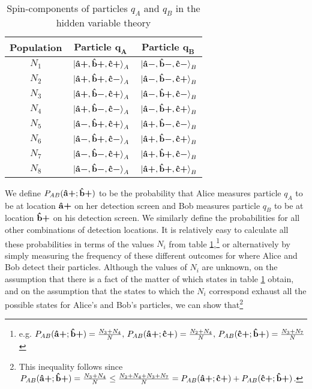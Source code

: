       \begin{table}[ht]
      \caption{Spin-components of particles $q_A$ and $q_B$ in the hidden variable theory}
      \centering
      \begin{tabular}{c c c} 
      \\ 
      \hline
      \textbf{Population}& \textbf{Particle} $\bm{q_A}$ & \textbf{Particle} $\bm{q_B}$ \\ [0.5ex] 
      \hline
      $N_1$ & $\ket*{\vb{\hat{{a}}}\bm{+},\vb{\hat{{b}}}\bm{+},\vb{\hat{{c}}}\bm{+}}_A$ & $\ket*{\vb{\hat{{a}}}\bm{-},\vb{\hat{{b}}}\bm{-},\vb{\hat{{c}}}\bm{-}}_B$ \\ 
      
      $N_2$ & $\ket*{\vb{\hat{{a}}}\bm{+},\vb{\hat{{b}}}\bm{+},\vb{\hat{{c}}}\bm{-}}_A$ & $\ket*{\vb{\hat{{a}}}\bm{-},\vb{\hat{{b}}}\bm{-},\vb{\hat{{c}}}\bm{+}}_B $\\ 
      
      $N_3$ & $\ket*{\vb{\hat{{a}}}\bm{+},\vb{\hat{{b}}}\bm{-},\vb{\hat{{c}}}\bm{+}}_A$ & $\ket*{\vb{\hat{{a}}}\bm{-},\vb{\hat{{b}}}\bm{+},\vb{\hat{{c}}}\bm{-}}_B$ \\ 
      
      $N_4$ & $\ket*{\vb{\hat{{a}}}\bm{+},\vb{\hat{{b}}}\bm{-},\vb{\hat{{c}}}\bm{-}}_A$ & $\ket*{\vb{\hat{{a}}}\bm{-},\vb{\hat{{b}}}\bm{+},\vb{\hat{{c}}}\bm{+}}_B $\\ 
      
      $N_5$ & $\ket*{\vb{\hat{{a}}}\bm{-},\vb{\hat{{b}}}\bm{+},\vb{\hat{{c}}}\bm{+}}_A$ & $\ket*{\vb{\hat{{a}}}\bm{+},\vb{\hat{{b}}}\bm{-},\vb{\hat{{c}}}\bm{-}}_B$ \\ 
      
      $N_6$ & $\ket*{\vb{\hat{{a}}}\bm{-},\vb{\hat{{b}}}\bm{+},\vb{\hat{{c}}}\bm{-}}_A$ & $\ket*{\vb{\hat{{a}}}\bm{+},\vb{\hat{{b}}}\bm{-},\vb{\hat{{c}}}\bm{+}}_B$ \\ 
      
      $N_7$ & $\ket*{\vb{\hat{{a}}}\bm{-},\vb{\hat{{b}}}\bm{-},\vb{\hat{{c}}}\bm{+}}_A$ & $\ket*{\vb{\hat{{a}}}\bm{+},\vb{\hat{{b}}}\bm{+},\vb{\hat{{c}}}\bm{-} }_B$\\ 
      
      $N_8$ & $\ket*{\vb{\hat{{a}}}\bm{-},\vb{\hat{{b}}}\bm{-},\vb{\hat{{c}}}\bm{-}}_A$ & $\ket*{\vb{\hat{{a}}}\bm{+},\vb{\hat{{b}}}\bm{+},\vb{\hat{{c}}}\bm{+}}_B$ \\ 
      \hline
      \end{tabular}
      \label{hiddentable}
      \end{table}
       We define $P_{AB}(\vb{\hat{{a}}}\bm{+};\vb{\hat{{b}}}\bm{+})$ to be the probability that Alice measures particle $q_A$ to be at location $\vb{\hat{{a}}}\bm{+}$ on her detection screen and Bob measures particle $q_B$ to be at location $\vb{\hat{{b}}}\bm{+}$ on his detection screen. We similarly define the probabilities for all other combinations of detection locations. It is relatively easy to calculate all these probabilities in terms of the values $N_i$ from table \ref{hiddentable},\footnote{e.g.  $P_{AB}(\vb{\hat{{a}}}\bm{+};\vb{\hat{{b}}}\bm{+})=\frac{N_3+N_4}{N},\, P_{AB}(\vb{\hat{{a}}}\bm{+};\vb{\hat{{c}}}\bm{+})=\frac{N_2+N_4}{N},\,P_{AB}(\vb{\hat{{c}}}\bm{+};\vb{\hat{{b}}}\bm{+})=\frac{N_3+N_7}{N}$  } or alternatively by simply measuring the frequency of these different outcomes for where Alice and Bob detect their particles. Although the values of $N_i$ are unknown, on the assumption that there is a fact of the matter of which states in table \ref{hiddentable} obtain, and on the assumption that the states to which the $N_i$ correspond exhaust all the possible states for Alice's and Bob's particles, we can show that\footnote{This inequality follows since $P_{AB}(\vb{\hat{{a}}}\bm{+};\vb{\hat{{b}}}\bm{+})=\frac{N_3+N_4}{N}\leq \frac{N_2+N_4+N_3+N_7}{N}=P_{AB}(\vb{\hat{{a}}}\bm{+};\vb{\hat{{c}}}\bm{+})+P_{AB}(\vb{\hat{{c}}}\bm{+};\vb{\hat{{b}}}\bm{+})$.}

